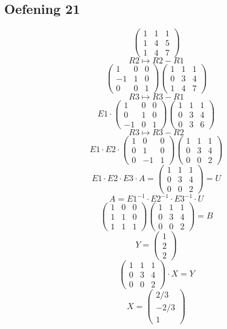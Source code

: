 \documentclass[lineaire_algebra_oplossingen.tex]{subfiles}
\begin{document}
\subsection{Oefening 21}
\[
\begin{pmatrix}
1 & 1 & 1\\
1 & 4 & 5\\
1 & 4 & 7
\end{pmatrix}
\]
\[R2 \longmapsto R2-R1\]
\[
\begin{pmatrix}
1 & 0 & 0\\
-1 & 1 & 0\\
0 & 0 & 1
\end{pmatrix}
\begin{pmatrix}
1 & 1 & 1\\
0 & 3 & 4\\
1 & 4 & 7
\end{pmatrix}
\]
\[R3 \longmapsto R3-R1\]
\[ E1 \cdot
\begin{pmatrix}
1 & 0 & 0\\
0 & 1 & 0\\
-1 & 0 & 1
\end{pmatrix}
\begin{pmatrix}
1 & 1 & 1\\
0 & 3 & 4\\
0 & 3 & 6
\end{pmatrix}
\]
\[R3 \longmapsto R3-R2\]
\[ E1 \cdot E2 \cdot
\begin{pmatrix}
1 & 0 & 0\\
0 & 1 & 0\\
0 & -1 & 1
\end{pmatrix}
\begin{pmatrix}
1 & 1 & 1\\
0 & 3 & 4\\
0 & 0 & 2
\end{pmatrix}
\]
\[\]
\[E1 \cdot E2 \cdot E3 \cdot A = 
\begin{pmatrix}
1 & 1 & 1\\
0 & 3 & 4\\
0 & 0 & 2
\end{pmatrix}
= U \]
\[A = E1^{-1} \cdot E2^{-1} \cdot E3^{-1} \cdot U\]
\[
\begin{pmatrix}
1 & 0 & 0\\
1 & 1 & 0\\
1 & 1 & 1
\end{pmatrix}
\begin{pmatrix}
1 & 1 & 1\\
0 & 3 & 4\\
0 & 0 & 2
\end{pmatrix}
= B\]
\[ Y =
\begin{pmatrix}
1 \\
2 \\
2 
\end{pmatrix}
\]
\[
\begin{pmatrix}
1 & 1 & 1\\
0 & 3 & 4\\
0 & 0 & 2
\end{pmatrix}
\cdot X = Y\]
\[ X =
\begin{pmatrix}
2/3\\
-2/3\\
1
\end{pmatrix}
\]
\end{document}
